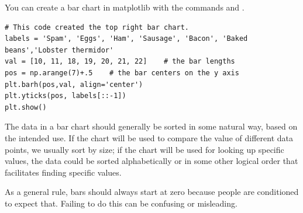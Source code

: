 You can create a bar chart in matplotlib with the commands  and .
\begin{lstlisting}
# This code created the top right bar chart.
labels = 'Spam', 'Eggs', 'Ham', 'Sausage', 'Bacon', 'Baked beans','Lobster thermidor'
val = [10, 11, 18, 19, 20, 21, 22]    # the bar lengths
pos = np.arange(7)+.5    # the bar centers on the y axis
plt.barh(pos,val, align='center')
plt.yticks(pos, labels[::-1])
plt.show()
\end{lstlisting}

The data in a bar chart should generally be sorted in some natural way, based on the intended use.  If the chart will be used to compare the value of different data points, we usually sort by size; if the chart will be used for looking up specific values, the data could be sorted alphabetically or in some other logical order that facilitates finding specific values.

As a general rule, bars should always start at zero because people are conditioned to expect that.  Failing to do this can be confusing or misleading.  

